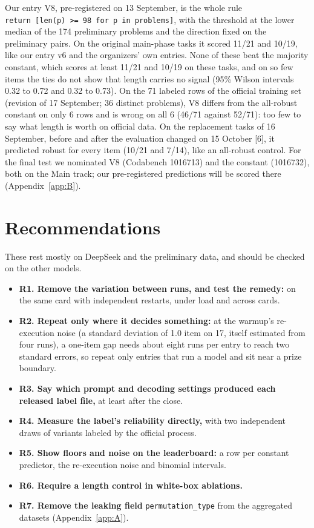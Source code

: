 \documentclass{article}
\begin{document}
Our entry V8, pre-registered on 13 September, is the whole rule \texttt{return~[len(p)~>=~98 for~p~in~problems]}, with the threshold at the lower median of the 174 preliminary problems and the direction fixed on the preliminary pairs. On the original main-phase tasks it scored 11/21 and 10/19, like our entry v6 and the organizers' own entries. None of these beat the majority constant, which scores at least 11/21 and 10/19 on these tasks, and on so few items the ties do not show that length carries no signal (95\% Wilson intervals 0.32 to 0.72 and 0.32 to 0.73). On the 71 labeled rows of the official training set (revision of 17 September; 36 distinct problems), V8 differs from the all-robust constant on only 6 rows and is wrong on all 6 (46/71 against 52/71): too few to say what length is worth on official data. On the replacement tasks of 16 September, before and after the evaluation changed on 15 October [6], it predicted robust for every item (10/21 and 7/14), like an all-robust control. For the final test we nominated V8 (Codabench 1016713) and the constant (1016732), both on the Main track; our pre-registered predictions will be scored there (Appendix~\ref{app:B}).

\section{Recommendations}\label{sec:recs}

These rest mostly on DeepSeek and the preliminary data, and should be checked on the other models.
\begin{itemize}
\item \textbf{R1. Remove the variation between runs, and test the remedy:} on the same card with independent restarts, under load and across cards.
\item \textbf{R2. Repeat only where it decides something:} at the warmup's re-execution noise (a standard deviation of 1.0 item on 17, itself estimated from four runs), a one-item gap needs about eight runs per entry to reach two standard errors, so repeat only entries that run a model and sit near a prize boundary.
\item \textbf{R3. Say which prompt and decoding settings produced each released label file,} at least after the close.
\item \textbf{R4. Measure the label's reliability directly,} with two independent draws of variants labeled by the official process.
\item \textbf{R5. Show floors and noise on the leaderboard:} a row per constant predictor, the re-execution noise and binomial intervals.
\item \textbf{R6. Require a length control in white-box ablations.}
\item \textbf{R7. Remove the leaking field} \texttt{permutation\_type} from the aggregated datasets (Appendix~\ref{app:A}).
\end{itemize}
\end{document}
